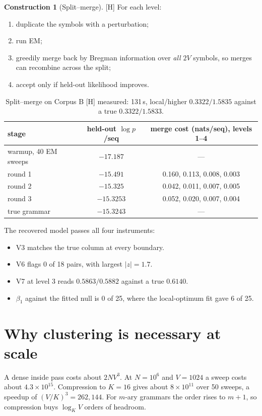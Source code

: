 \documentclass[11pt]{article}
\theoremstyle{definition}
\newtheorem{construction}[theorem]{Construction}
\theoremstyle{remark}
\newcommand{\src}[1]{\textsf{\small[#1]}}
\newcommand{\st}[1]{\textsf{\small\color{gray}#1}}
\begin{document}
\begin{construction}[Split--merge]\src{H}
For each level:
\begin{enumerate}
  \item duplicate the symbols with a perturbation;
  \item run EM;
  \item greedily merge back by Bregman information over \emph{all} $2V$ symbols, so merges can recombine across the split;
  \item accept only if held-out likelihood improves.
\end{enumerate}
\end{construction}
\begin{table}[!htbp]\centering\small
\begin{tabular}{lcc}
\toprule
stage & held-out $\log p$/seq & merge cost (nats/seq), levels 1--4\\
\midrule
warmup, 40 EM sweeps & $-17.187$ & ---\\
round 1 & $-15.491$ & 0.160, 0.113, 0.008, 0.003\\
round 2 & $-15.325$ & 0.042, 0.011, 0.007, 0.005\\
round 3 & $-15.3253$ & 0.052, 0.020, 0.007, 0.004\\
true grammar & $\mathbf{-15.3243}$ & ---\\
\bottomrule
\end{tabular}
\caption{Split--merge on Corpus B \src{H} \st{measured}: 131\,s, local/higher $0.3322/1.5835$ against a true $0.3322/1.5833$.}
\end{table}

The recovered model passes all four instruments:
\begin{itemize}
  \item V3 matches the true column at every boundary.
  \item V6 flags 0 of 18 pairs, with largest $|z|=1.7$.
  \item V7 at level 3 reads $0.5863/0.5882$ against a true $0.6140$.
  \item $\beta_1$ against the fitted null is 0 of 25, where the local-optimum fit gave 6 of 25.
\end{itemize}

\section{Why clustering is necessary at scale}
A dense inside pass costs about $2NV^3$. At $N=10^6$ and $V=1024$ a sweep costs about $4.3\times10^{15}$. Compression to $K=16$ gives about $8\times10^{11}$ over 50 sweeps, a speedup of $(V/K)^3=262{,}144$. For $m$-ary grammars the order rises to $m+1$, so compression buys $\log_KV$ orders of headroom.
\end{document}
